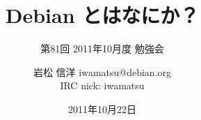 




\documentclass[cjk,dvipdfmx,12pt]{beamer}
\usepackage{monthlypresentation}



\title{Debian とはなにか？}
\subtitle{第81回 2011年10月度 勉強会}
\author{岩松 信洋 iwamatsu@debian.org\\IRC nick: iwamatsu}
\date{2011年10月22日}



